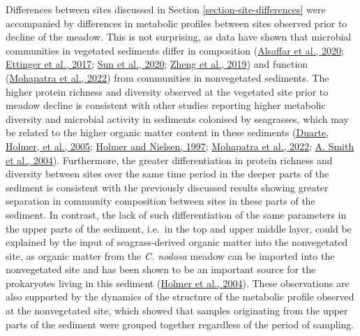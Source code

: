 \documentclass[
  12 pt,
]{book}
\begin{document}
Differences between sites discussed in Section \ref{section-site-differences} were accompanied by differences in metabolic profiles between sites observed prior to decline of the meadow. This is not surprising, as data have shown that microbial communities in vegetated sediments differ in composition (\protect\hyperlink{ref-Alsaffar2020}{Alsaffar et al., 2020}; \protect\hyperlink{ref-Ettinger2017}{Ettinger et al., 2017}; \protect\hyperlink{ref-Sun2020}{Sun et al., 2020}; \protect\hyperlink{ref-Zheng2019}{Zheng et al., 2019}) and function (\protect\hyperlink{ref-Mohapatra2022}{Mohapatra et al., 2022}) from communities in nonvegetated sediments. The higher protein richness and diversity observed at the vegetated site prior to meadow decline is consistent with other studies reporting higher metabolic diversity and microbial activity in sediments colonised by seagrasses, which may be related to the higher organic matter content in these sediments (\protect\hyperlink{ref-Duarte2005}{Duarte, Holmer, et al., 2005}; \protect\hyperlink{ref-Holmer1997}{Holmer and Nielsen, 1997}; \protect\hyperlink{ref-Mohapatra2022}{Mohapatra et al., 2022}; \protect\hyperlink{ref-Smith2004}{A. Smith et al., 2004}). Furthermore, the greater differentiation in protein richness and diversity between sites over the same time period in the deeper parts of the sediment is consistent with the previously discussed results showing greater separation in community composition between sites in these parts of the sediment. In contrast, the lack of such differentiation of the same parameters in the upper parts of the sediment, i.e.~in the top and upper middle layer, could be explained by the input of seagrass-derived organic matter into the nonvegetated site, as organic matter from the \emph{C. nodosa} meadow can be imported into the nonvegetated site and has been shown to be an important source for the prokaryotes living in this sediment (\protect\hyperlink{ref-Holmer2004}{Holmer et al., 2004}). These observations are also supported by the dynamics of the structure of the metabolic profile observed at the nonvegetated site, which showed that samples originating from the upper parts of the sediment were grouped together regardless of the period of sampling.
\end{document}
